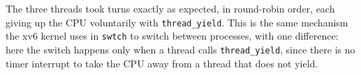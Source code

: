\documentclass[12pt,a4paper]{article}
\begin{document}
The three threads took turns exactly as expected, in round-robin order, each giving up the CPU voluntarily with \texttt{thread\_yield}. This is the same mechanism the xv6 kernel uses in \texttt{swtch} to switch between processes, with one difference: here the switch happens only when a thread calls \texttt{thread\_yield}, since there is no timer interrupt to take the CPU away from a thread that does not yield.
\end{document}
